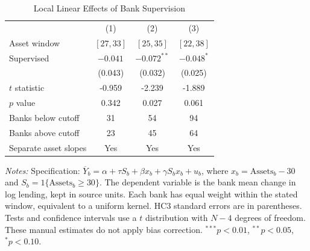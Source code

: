 \begin{table}[H]
\centering
\small
\caption{Local Linear Effects of Bank Supervision}
\label{tab:q2_windows}
\begin{tabular*}{\textwidth}{@{\extracolsep{\fill}}lccc}
\toprule
 & (1) & (2) & (3) \\
Asset window & $[27,33]$ & $[25,35]$ & $[22,38]$ \\
\midrule
Supervised & $-0.041^{}$ & $-0.072^{**}$ & $-0.048^{*}$ \\
 & (0.043) & (0.032) & (0.025) \\
$t$ statistic & -0.959 & -2.239 & -1.889 \\
$p$ value & 0.342 & 0.027 & 0.061 \\
\midrule
Banks below cutoff & 31 & 54 & 94 \\
Banks above cutoff & 23 & 45 & 64 \\
Separate asset slopes & Yes & Yes & Yes \\
\bottomrule
\end{tabular*}
\begin{minipage}{\textwidth}\footnotesize
\textit{Notes:} Specification: $\overline{Y}_b=\alpha+\tau S_b+\beta x_b+\gamma S_bx_b+u_b$, where $x_b=\mathrm{Assets}_b-30$ and $S_b=1\{\mathrm{Assets}_b\geq30\}$. The dependent variable is the bank mean change in log lending, kept in source units. Each bank has equal weight within the stated window, equivalent to a uniform kernel. HC3 standard errors are in parentheses. Tests and confidence intervals use a $t$ distribution with $N-4$ degrees of freedom. These manual estimates do not apply bias correction. $^{***}p<0.01$, $^{**}p<0.05$, $^{*}p<0.10$.
\end{minipage}
\end{table}
